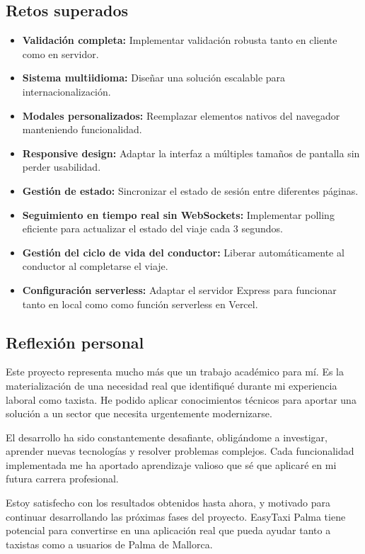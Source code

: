 \documentclass[12pt,a4paper]{article}
\begin{document}
\subsection{Retos superados}

\begin{itemize}
    \item \textbf{Validación completa:} Implementar validación robusta tanto en cliente como en servidor.
    \item \textbf{Sistema multiidioma:} Diseñar una solución escalable para internacionalización.
    \item \textbf{Modales personalizados:} Reemplazar elementos nativos del navegador manteniendo funcionalidad.
    \item \textbf{Responsive design:} Adaptar la interfaz a múltiples tamaños de pantalla sin perder usabilidad.
    \item \textbf{Gestión de estado:} Sincronizar el estado de sesión entre diferentes páginas.
    \item \textbf{Seguimiento en tiempo real sin WebSockets:} Implementar polling eficiente para actualizar el estado del viaje cada 3 segundos.
    \item \textbf{Gestión del ciclo de vida del conductor:} Liberar automáticamente al conductor al completarse el viaje.
    \item \textbf{Configuración serverless:} Adaptar el servidor Express para funcionar tanto en local como como función serverless en Vercel.
\end{itemize}

\subsection{Reflexión personal}

Este proyecto representa mucho más que un trabajo académico para mí. Es la materialización de una necesidad real que identifiqué durante mi experiencia laboral como taxista. He podido aplicar conocimientos técnicos para aportar una solución a un sector que necesita urgentemente modernizarse.

El desarrollo ha sido constantemente desafiante, obligándome a investigar, aprender nuevas tecnologías y resolver problemas complejos. Cada funcionalidad implementada me ha aportado aprendizaje valioso que sé que aplicaré en mi futura carrera profesional.

Estoy satisfecho con los resultados obtenidos hasta ahora, y motivado para continuar desarrollando las próximas fases del proyecto. EasyTaxi Palma tiene potencial para convertirse en una aplicación real que pueda ayudar tanto a taxistas como a usuarios de Palma de Mallorca.
\end{document}
